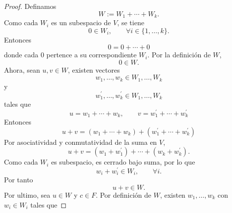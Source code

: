 \documentclass[12pt,a4paper]{article}
\begin{document}
    \begin{proof}
        Definamos
        \begin{equation*}
            W:=W_{1}+\cdots+W_{k}.
        \end{equation*}
        Como cada $W_{i}$ es un subespacio de $V$, se tiene
        \begin{equation*}
            0\in W_{i},\qquad\forall i\in\{1,\dots,k\}.
        \end{equation*}
        Entonces
        \begin{equation*}
            0=0+\cdots+0
        \end{equation*}
        donde cada 0 pertence a su correspondiente $W_{i}$. Por la definición de $W$,
        \begin{equation*}
            0\in W.
        \end{equation*}
        Ahora, sean $u,v\in W$, existen vectores
        \begin{equation*}
            w_{1},\dots,w_{k}\in W_{1},\dots,W_{k}
        \end{equation*}
        y
        \begin{equation*}
            w_{1}^{\prime},\dots,w_{k}^{\prime}\in W_{1},\dots,W_{k}
        \end{equation*}
        tales que
        \begin{equation*}
            u=w_{1}+\cdots+w_{k},\qquad v=w_{1}^{\prime}+\cdots+w_{k}^{\prime}
        \end{equation*}
        Entonces
        \begin{equation*}
            u+v=(w_{1}+\cdots+w_{k})+(w_{1}^{\prime}+\cdots+w_{k}^{\prime})
        \end{equation*}
        Por asociatividad y conmutatividad de la suma en $V$,
        \begin{equation*}
            u+v=(w_{1}+w_{1}^{\prime})+\cdots+(w_{k}+w_{k}^{\prime}).
        \end{equation*}
        Como cada $W_{i}$ es subespacio, es cerrado bajo suma, por lo que
        \begin{equation*}
            w_{i}+w_{i}^{\prime}\in W_{i},\qquad\forall i.
        \end{equation*}
        Por tanto
        \begin{equation*}
            u+v\in W.
        \end{equation*}
        Por ultimo, sea $u\in W$ y $c\in F$. Por definición de $W$, existen $w_{1},\dots,w_{k}$
        con $w_{i}\in W_{i}$ tales que

\end{proof}
\end{document}
